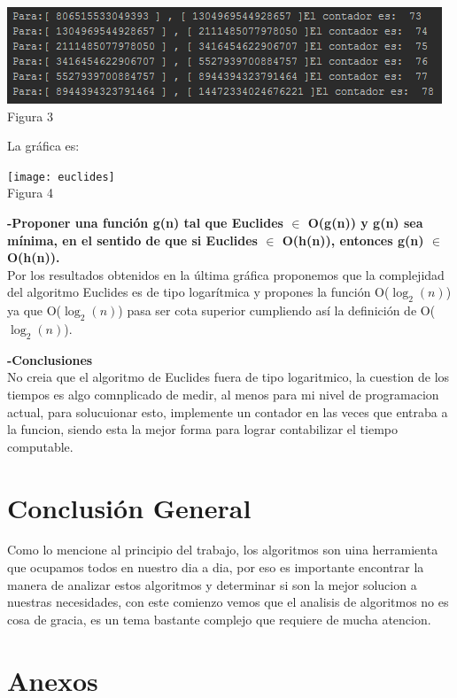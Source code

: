 \documentclass[spanish]{article}
\begin{document}
{\begin{center}
		\includegraphics{fibo3}\\
		Figura 3\\
	\end{center}

	La gráfica es:\\
	\begin{center}
		\texttt{[image: euclides]}\\
		Figura 4\\
	\end{center}

	{\large{\bf -Proponer una función g(n) tal que Euclides $\in$ O(g(n)) y g(n) sea mínima, en el sentido de que si Euclides $\in$  O(h(n)), entonces g(n) $\in$  O(h(n)).}}\\
	Por los resultados obtenidos en la última gráfica proponemos que la complejidad del algoritmo Euclides es de tipo logarítmica y propones la función O($\log_{2}(n)$) ya que O($\log_{2}(n)$) pasa ser cota superior cumpliendo así la definición de O($\log_{2}(n)$).
	\bigskip

	{\large {\bf -Conclusiones}}\\
	No creia que el algoritmo de Euclides fuera de tipo logaritmico, la cuestion de los tiempos es algo comnplicado de medir, al menos para mi nivel de programacion actual, para solucuionar esto, implemente un contador en las veces que entraba a la funcion, siendo esta la mejor forma para lograr contabilizar el tiempo computable.
	\newpage
	\section{Conclusi\'on General}
	Como lo mencione al principio del trabajo, los algoritmos son uina herramienta que ocupamos todos en nuestro dia a dia, por eso es importante encontrar la manera de analizar estos algoritmos y determinar si son la mejor solucion a nuestras necesidades, con este comienzo vemos que el analisis de algoritmos no es cosa de gracia, es un tema bastante complejo que requiere de mucha atencion.
	\newpage
	\section{Anexos}
	
}
\end{document}
